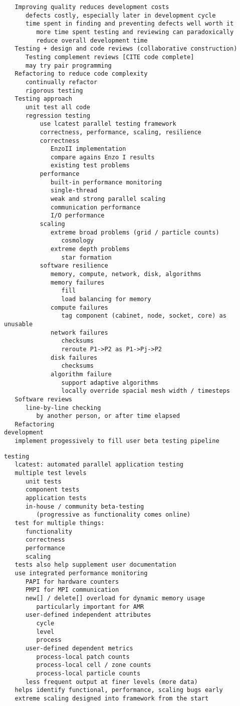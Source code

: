\documentclass{article}
\begin{document}
\begin{verbatim}
   Improving quality reduces development costs
      defects costly, especially later in development cycle
      time spent in finding and preventing defects well worth it
         more time spent testing and reviewing can paradoxically
         reduce overall development time
   Testing + design and code reviews (collaborative construction)
      Testing complement reviews [CITE code complete]
      may try pair programming
   Refactoring to reduce code complexity
      continually refactor
      rigorous testing
   Testing approach
      unit test all code
      regression testing
          use lcatest parallel testing framework
          correctness, performance, scaling, resilience
          correctness
             EnzoII implementation
             compare agains Enzo I results
             existing test problems
          performance
             built-in performance monitoring
             single-thread
             weak and strong parallel scaling 
             communication performance
             I/O performance
          scaling
             extreme broad problems (grid / particle counts)
                cosmology
             extreme depth problems
                star formation
          software resilience
             memory, compute, network, disk, algorithms
             memory failures
                fill
                load balancing for memory
             compute failures
                tag component (cabinet, node, socket, core) as unusable
             network failures
                checksums
                reroute P1->P2 as P1->Pj->P2
             disk failures
                checksums
             algorithm failure
                support adaptive algorithms
                locally override spacial mesh width / timesteps
   Software reviews
      line-by-line checking
         by another person, or after time elapsed
   Refactoring
development
   implement progessively to fill user beta testing pipeline
\end{verbatim}

\begin{verbatim}
testing
   lcatest: automated parallel application testing
   multiple test levels
      unit tests
      component tests
      application tests
      in-house / community beta-testing
         (progressive as functionality comes online)
   test for multiple things:
      functionality
      correctness
      performance
      scaling
   tests also help supplement user documentation
   use integrated performance monitoring
      PAPI for hardware counters
      PMPI for MPI communication
      new[] / delete[] overload for dynamic memory usage
         particularly important for AMR
      user-defined independent attributes
         cycle
         level
         process
      user-defined dependent metrics
         process-local patch counts
         process-local cell / zone counts
         process-local particle counts
      less frequent output at finer levels (more data)
   helps identify functional, performance, scaling bugs early
   extreme scaling designed into framework from the start
\end{verbatim}
\end{document}
